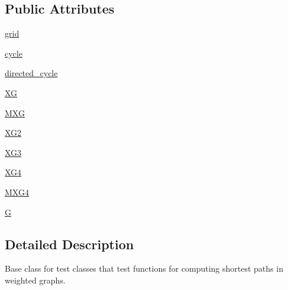 \subsection*{Public Attributes}
\begin{DoxyCompactItemize}
\item 
\hyperlink{classnetworkx_1_1algorithms_1_1shortest__paths_1_1tests_1_1test__weighted_1_1WeightedTestBase_ab529dfb06b11eb2043407f1b7b7eb8bb}{grid}
\item 
\hyperlink{classnetworkx_1_1algorithms_1_1shortest__paths_1_1tests_1_1test__weighted_1_1WeightedTestBase_ab62c6c92b6aa4c8465df1dc5c8b8e9eb}{cycle}
\item 
\hyperlink{classnetworkx_1_1algorithms_1_1shortest__paths_1_1tests_1_1test__weighted_1_1WeightedTestBase_af37cf0a5786349cab82b6d99f84adc71}{directed\+\_\+cycle}
\item 
\hyperlink{classnetworkx_1_1algorithms_1_1shortest__paths_1_1tests_1_1test__weighted_1_1WeightedTestBase_ab8027f8fcffb32152112265f382eb8a0}{XG}
\item 
\hyperlink{classnetworkx_1_1algorithms_1_1shortest__paths_1_1tests_1_1test__weighted_1_1WeightedTestBase_aa12f0f97ffb7101abf54c62dbbec7e18}{M\+XG}
\item 
\hyperlink{classnetworkx_1_1algorithms_1_1shortest__paths_1_1tests_1_1test__weighted_1_1WeightedTestBase_ab8f4f8065dbb7ed04dcc44ba05f09210}{X\+G2}
\item 
\hyperlink{classnetworkx_1_1algorithms_1_1shortest__paths_1_1tests_1_1test__weighted_1_1WeightedTestBase_a6dfb7dd3d84ad932aa4683182491367e}{X\+G3}
\item 
\hyperlink{classnetworkx_1_1algorithms_1_1shortest__paths_1_1tests_1_1test__weighted_1_1WeightedTestBase_a986d6c856d76eac3c1b6ee4b61169495}{X\+G4}
\item 
\hyperlink{classnetworkx_1_1algorithms_1_1shortest__paths_1_1tests_1_1test__weighted_1_1WeightedTestBase_a40537957fb2796752bf9df6165489a2a}{M\+X\+G4}
\item 
\hyperlink{classnetworkx_1_1algorithms_1_1shortest__paths_1_1tests_1_1test__weighted_1_1WeightedTestBase_ad2576ece5b0b1e58927850cc7e962021}{G}
\end{DoxyCompactItemize}


\subsection{Detailed Description}
\begin{DoxyVerb}Base class for test classes that test functions for computing
shortest paths in weighted graphs.\end{DoxyVerb}
 

